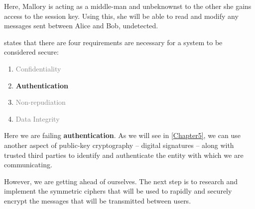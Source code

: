 Here, Mallory is acting as a middle-man and unbeknownst to the other she gains access to the session key. Using this, she will be able to read and modify any messages sent between Alice and Bob, undetected.

 states that there are four requirements are necessary for a system to be considered secure:

\begin{enumerate}
	\item \textcolor{gray}{Confidentiality}
	\item \textbf{Authentication}
	\item \textcolor{gray}{Non-repudiation}
	\item \textcolor{gray}{Data Integrity}
\end{enumerate}

Here we are failing \textbf{authentication}. As we will see in \textsection\ref{Chapter5}, we can use another aspect of public-key cryptography -- digital signatures -- along with trusted third parties to identify and authenticate the entity with which we are communicating.

However, we are getting ahead of ourselves. The next step is to research and implement the symmetric ciphers that will be used to rapidly and securely encrypt the messages that will be transmitted between users.